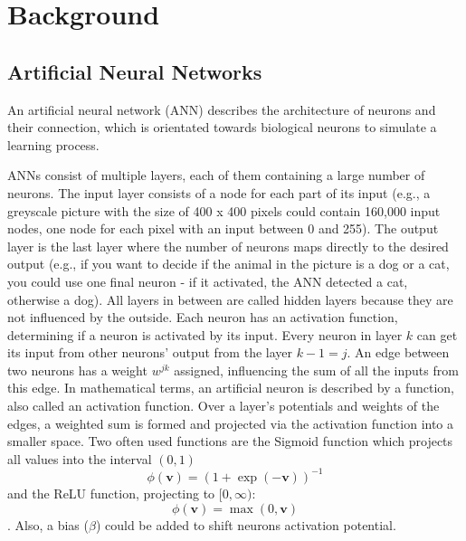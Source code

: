 \chapter{Background}
\label{ch:background}

\section{Artificial Neural  Networks}
\label{sec:ann}
An artificial neural network (ANN)  \cite{rashid2016make} \cite{youtube3blue1brown}  \cite{zhang2023dive} describes the architecture of neurons and their connection,  which is orientated towards biological neurons to simulate a learning process. 

ANNs consist of multiple layers, each of them containing a large number of neurons. The input layer consists of a node for each part of its input (e.g., a greyscale picture with the size of 400 x 400 pixels could contain 160,000 input nodes, one node for each pixel with an input between 0 and 255). The output layer is the last layer where the number of neurons maps directly to the desired output (e.g., if you want to decide if the animal in the picture is a dog or a cat, you could use one final neuron - if it activated, the ANN detected a cat, otherwise a dog). All layers in between are called hidden layers because they are not influenced by the outside. Each neuron has an activation function, determining if a neuron is activated by its input. Every neuron in layer $k$ can get its input from other neurons' output from the layer $k-1 = j$. An edge between two neurons has a weight $w^{jk}$ assigned, influencing the sum of all the inputs from this edge. In mathematical terms, an artificial neuron is described by a function, also called an activation function. Over a layer's potentials and weights of the edges, a weighted sum is formed and projected via the activation function into a smaller space. Two often used functions are the Sigmoid function which projects all values into the interval $(0, 1)$
\begin{equation}
{\phi (\mathbf{v} )=(1+\exp(- \mathbf {v}))^{-1}}
\end{equation}  
and the ReLU function, projecting to $[0, \infty)$:
\begin{equation}
\phi (\mathbf{v}) = \max(0, \mathbf{v})
\end{equation}.
Also, a bias ($\beta$) could be added to shift neurons activation potential. 

